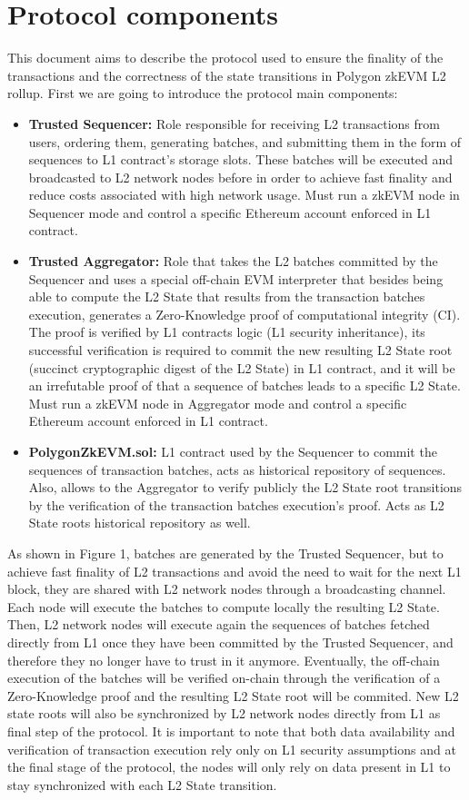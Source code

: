 \section{Protocol components}
This document aims to describe the protocol used to ensure the finality of the transactions and the correctness of the state transitions in Polygon zkEVM L2 rollup. First we are going to introduce the protocol main components:
\begin{itemize}
	\item \textbf{Trusted Sequencer:} Role responsible for receiving L2 transactions from users, ordering them, generating batches, and submitting them in the form of sequences to L1 contract's storage slots. These batches will be executed and broadcasted to L2 network nodes before in order to achieve fast finality and reduce costs associated with high network usage. Must run a zkEVM node in Sequencer mode and control a specific Ethereum account enforced in L1 contract. 
	\item \textbf{Trusted Aggregator:} Role that takes the L2 batches committed by the Sequencer and uses a special off-chain EVM interpreter that besides being able to compute the L2 State that results from the transaction batches execution, generates a Zero-Knowledge proof of computational integrity (CI). The proof is verified by L1 contracts logic (L1 security inheritance), its successful verification is required to commit the new resulting L2 State root (succinct cryptographic digest of the L2 State) in L1 contract, and it will be an irrefutable proof of that a sequence of batches leads to a specific L2 State. Must run a zkEVM node in Aggregator mode and control a specific Ethereum account enforced in L1 contract.
	\item \textbf{PolygonZkEVM.sol:} L1 contract used by the Sequencer to commit the sequences of transaction batches, acts as historical repository of sequences. Also, allows to the Aggregator to verify publicly the L2 State root transitions by the verification of the transaction batches execution’s proof. Acts as L2 State roots historical repository as well.
\end{itemize}

As shown in Figure 1, batches are generated by the Trusted Sequencer, but to achieve fast finality of L2 transactions and avoid the need to wait for the next L1 block, they are shared with L2 network nodes through a broadcasting channel. Each node will execute the batches to compute locally the resulting L2 State. Then, L2 network nodes will execute again the sequences of batches fetched directly from L1 once they have been committed by the Trusted Sequencer, and therefore they no longer have to trust in it anymore. Eventually, the off-chain execution of the batches will be verified on-chain through the verification of a Zero-Knowledge proof and the resulting L2 State root will be commited. New L2 state roots will also be synchronized by L2 network nodes directly from L1 as final step of the protocol. It is important to note that both data availability and verification of transaction execution rely only on L1 security assumptions and at the final stage of the protocol, the nodes will only rely on data present in L1 to stay synchronized with each L2 State transition.

